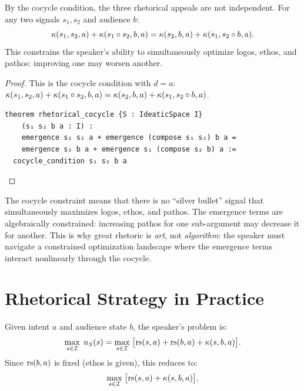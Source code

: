\begin{theorem}
\label{thm:rhetorical-constraint}
By the cocycle condition, the three rhetorical appeals are not independent.
For any two signals $s_1, s_2$ and audience $b$:
\[
  \kappa(s_1, s_2, a) + \kappa(s_1 \circ s_2, b, a) =
  \kappa(s_2, b, a) + \kappa(s_1, s_2 \circ b, a).
\]
This constrains the speaker's ability to simultaneously optimize logos,
ethos, and pathos: improving one may worsen another.
\end{theorem}

\begin{proof}
This is the cocycle condition with $d = a$:
$\kappa(s_1, s_2, a) + \kappa(s_1 \circ s_2, b, a) =
\kappa(s_2, b, a) + \kappa(s_1, s_2 \circ b, a)$.

\begin{lstlisting}[caption={Lean 4: Rhetorical cocycle constraint}]
theorem rhetorical_cocycle {S : IdeaticSpace I}
    (s₁ s₂ b a : I) :
    emergence s₁ s₂ a + emergence (compose s₁ s₂) b a =
    emergence s₂ b a + emergence s₁ (compose s₂ b) a :=
  cocycle_condition s₁ s₂ b a
\end{lstlisting}
\end{proof}

\begin{interpretation}
\label{interp:perfect-rhetoric}
The cocycle constraint means that there is no ``silver bullet'' signal that
simultaneously maximizes logos, ethos, and pathos.  The emergence terms are
algebraically constrained: increasing pathos for one sub-argument may decrease
it for another.  This is why great rhetoric is \emph{art}, not \emph{algorithm}:
the speaker must navigate a constrained optimization landscape where the
emergence terms interact nonlinearly through the cocycle.
\end{interpretation}


\section{Rhetorical Strategy in Practice}

\begin{definition}
\label{def:rhetorical-optimization}
Given intent $a$ and audience state $b$, the speaker's problem is:
\[
  \max_{s \in \mathcal{I}}\; u_S(s) = \max_{s \in \mathcal{I}}\;
  \bigl[\mathrm{rs}(s, a) + \mathrm{rs}(b, a) + \kappa(s, b, a)\bigr].
\]
Since $\mathrm{rs}(b, a)$ is fixed (ethos is given), this reduces to:
\[
  \max_{s \in \mathcal{I}}\; \bigl[\mathrm{rs}(s, a) + \kappa(s, b, a)\bigr].
\]
\end{definition}

